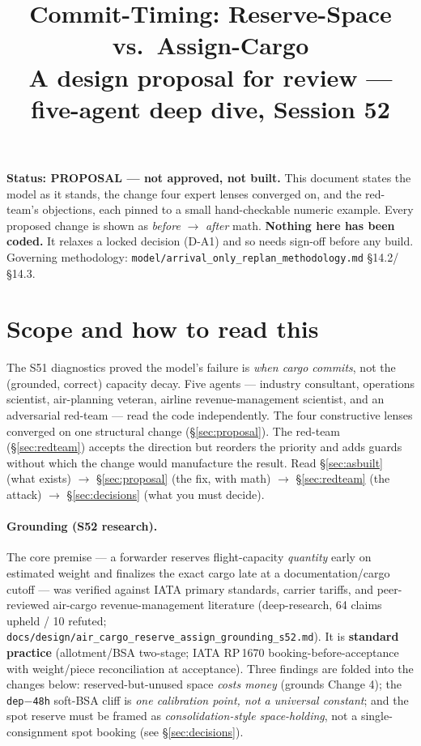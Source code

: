 \documentclass[11pt]{article}
\title{\textbf{Commit-Timing: Reserve-Space vs.\ Assign-Cargo}\\[2pt]
\large A design proposal for review --- five-agent deep dive, Session 52}
\author{}
\date{}
\newcommand{\code}[1]{\texttt{#1}}
\begin{document}
\maketitle
\vspace{-3em}

\begin{mdframed}[backgroundcolor=black!4,linewidth=0.4pt]
\textbf{Status: PROPOSAL --- not approved, not built.} This document states the model as it stands,
the change four expert lenses converged on, and the red-team's objections, each pinned to a small
hand-checkable numeric example. Every proposed change is shown as \emph{before} $\to$ \emph{after}
math. \textbf{Nothing here has been coded.} It relaxes a locked decision (D-A1) and so needs sign-off
before any build. Governing methodology: \code{model/arrival\_only\_replan\_methodology.md} \S14.2/\S14.3.
\end{mdframed}

\section{Scope and how to read this}
The S51 diagnostics proved the model's failure is \emph{when cargo commits}, not the (grounded, correct)
capacity decay. Five agents --- industry consultant, operations scientist, air-planning veteran, airline
revenue-management scientist, and an adversarial red-team --- read the code independently. The four
constructive lenses converged on one structural change (\S\ref{sec:proposal}). The red-team
(\S\ref{sec:redteam}) accepts the direction but reorders the priority and adds guards without which the
change would manufacture the result. Read \S\ref{sec:asbuilt} (what exists) $\to$ \S\ref{sec:proposal}
(the fix, with math) $\to$ \S\ref{sec:redteam} (the attack) $\to$ \S\ref{sec:decisions} (what you must decide).

\paragraph{Grounding (S52 research).} The core premise --- a forwarder reserves flight-capacity
\emph{quantity} early on estimated weight and finalizes the exact cargo late at a documentation/cargo
cutoff --- was verified against IATA primary standards, carrier tariffs, and peer-reviewed air-cargo
revenue-management literature (deep-research, 64 claims upheld / 10 refuted;
\code{docs/design/air\_cargo\_reserve\_assign\_grounding\_s52.md}). It is \textbf{standard practice}
(allotment/BSA two-stage; IATA RP\,1670 booking-before-acceptance with weight/piece reconciliation at
acceptance). Three findings are folded into the changes below: reserved-but-unused space \emph{costs
money} (grounds Change 4); the \code{dep$-$48h} soft-BSA cliff is \emph{one calibration point, not a
universal constant}; and the spot reserve must be framed as \emph{consolidation-style space-holding}, not
a single-consignment spot booking (see \S\ref{sec:decisions}).
\end{document}
